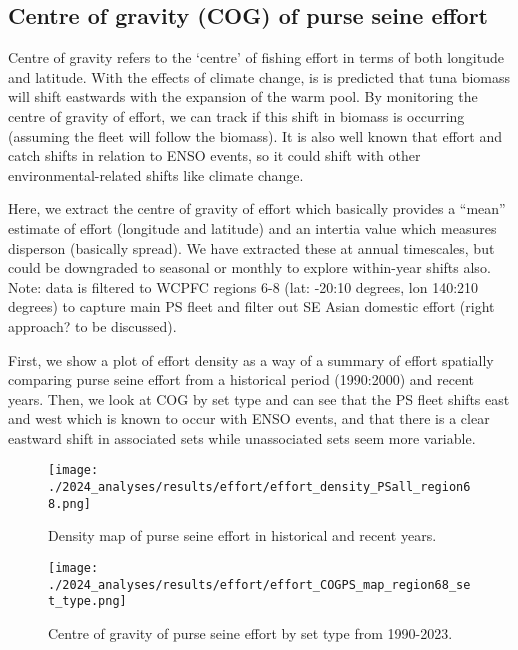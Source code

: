 \documentclass[
]{article}
\begin{document}
\hypertarget{centre-of-gravity-cog-of-purse-seine-effort}{%
\subsection{Centre of gravity (COG) of purse seine
effort}\label{centre-of-gravity-cog-of-purse-seine-effort}}

Centre of gravity refers to the `centre' of fishing effort in terms of
both longitude and latitude. With the effects of climate change, is is
predicted that tuna biomass will shift eastwards with the expansion of
the warm pool. By monitoring the centre of gravity of effort, we can
track if this shift in biomass is occurring (assuming the fleet will
follow the biomass). It is also well known that effort and catch shifts
in relation to ENSO events, so it could shift with other
environmental-related shifts like climate change.

Here, we extract the centre of gravity of effort which basically
provides a ``mean'' estimate of effort (longitude and latitude) and an
intertia value which measures disperson (basically spread). We have
extracted these at annual timescales, but could be downgraded to
seasonal or monthly to explore within-year shifts also. Note: data is
filtered to WCPFC regions 6-8 (lat: -20:10 degrees, lon 140:210 degrees)
to capture main PS fleet and filter out SE Asian domestic effort (right
approach? to be discussed).

First, we show a plot of effort density as a way of a summary of effort
spatially comparing purse seine effort from a historical period
(1990:2000) and recent years. Then, we look at COG by set type and can
see that the PS fleet shifts east and west which is known to occur with
ENSO events, and that there is a clear eastward shift in associated sets
while unassociated sets seem more variable.

\begin{figure}
\centering
\texttt{[image: ./2024\_analyses/results/effort/effort\_density\_PSall\_region68.png]}
\caption{Density map of purse seine effort in historical and recent
years.}
\end{figure}

\clearpage

\begin{figure}
\centering
\texttt{[image: ./2024\_analyses/results/effort/effort\_COGPS\_map\_region68\_set\_type.png]}
\caption{Centre of gravity of purse seine effort by set type from
1990-2023.}
\end{figure}
\end{document}
